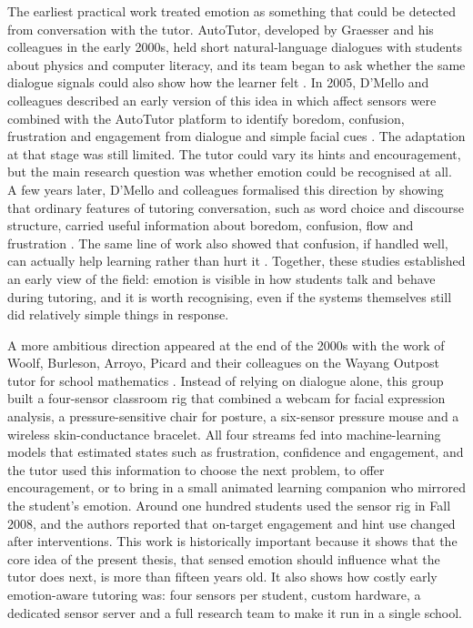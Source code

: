 The earliest practical work treated emotion as something that could be detected from conversation with the tutor. AutoTutor, developed by Graesser and his colleagues in the early 2000s, held short natural-language dialogues with students about physics and computer literacy, and its team began to ask whether the same dialogue signals could also show how the learner felt \cite{Graesser2004AutoTutorDialogue}. In 2005, D'Mello and colleagues described an early version of this idea in which affect sensors were combined with the AutoTutor platform to identify boredom, confusion, frustration and engagement from dialogue and simple facial cues \cite{dmello_integrating_2005}. The adaptation at that stage was still limited. The tutor could vary its hints and encouragement, but the main research question was whether emotion could be recognised at all. A few years later, D'Mello and colleagues formalised this direction by showing that ordinary features of tutoring conversation, such as word choice and discourse structure, carried useful information about boredom, confusion, flow and frustration \cite{DMello2008AutomaticDetectionLearnersAffect,dmello_language_2012}. The same line of work also showed that confusion, if handled well, can actually help learning rather than hurt it \cite{dmello2014confusionbeneficial}. Together, these studies established an early view of the field: emotion is visible in how students talk and behave during tutoring, and it is worth recognising, even if the systems themselves still did relatively simple things in response.

A more ambitious direction appeared at the end of the 2000s with the work of Woolf, Burleson, Arroyo, Picard and their colleagues on the Wayang Outpost tutor for school mathematics \cite{woolf_affect-aware_2009}. Instead of relying on dialogue alone, this group built a four-sensor classroom rig that combined a webcam for facial expression analysis, a pressure-sensitive chair for posture, a six-sensor pressure mouse and a wireless skin-conductance bracelet. All four streams fed into machine-learning models that estimated states such as frustration, confidence and engagement, and the tutor used this information to choose the next problem, to offer encouragement, or to bring in a small animated learning companion who mirrored the student's emotion. Around one hundred students used the sensor rig in Fall 2008, and the authors reported that on-target engagement and hint use changed after interventions. This work is historically important because it shows that the core idea of the present thesis, that sensed emotion should influence what the tutor does next, is more than fifteen years old. It also shows how costly early emotion-aware tutoring was: four sensors per student, custom hardware, a dedicated sensor server and a full research team to make it run in a single school.

